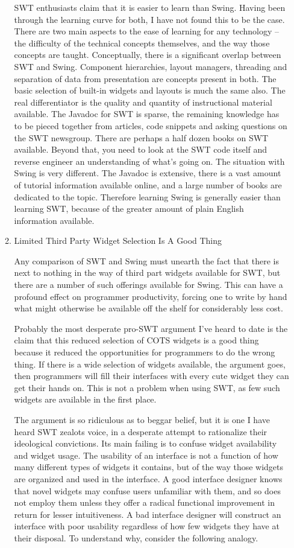 \documentclass{article}
\begin{document}
\begin{enumerate}
\begin{enumerate}
SWT enthusiasts claim that it is easier to learn than Swing. Having been
through the learning curve for both, I have not found this to be the
case. There are two main aspects to the ease of learning for any
technology -- the difficulty of the technical concepts themselves, and
the way those concepts are taught. Conceptually, there is a significant
overlap between SWT and Swing. Component hierarchies, layout managers,
threading and separation of data from presentation are concepts present
in both. The basic selection of built-in widgets and layouts is much the
same also. The real differentiator is the quality and quantity of
instructional material available. The Javadoc for SWT is sparse, the
remaining knowledge has to be pieced together from articles, code
snippets and asking questions on the SWT newsgroup. There are perhaps a
half dozen books on SWT available. Beyond that, you need to look at the
SWT code itself and reverse engineer an understanding of what's going
on. The situation with Swing is very different. The Javadoc is
extensive, there is a vast amount of tutorial information available
online, and a large number of books are dedicated to the topic.
Therefore learning Swing is generally easier than learning SWT, because
of the greater amount of plain English information available.

\item Limited Third Party Widget Selection Is A Good Thing
\label{sec:orgheadline296}

Any comparison of SWT and Swing must unearth the fact that there is next
to nothing in the way of third part widgets available for SWT, but there
are a number of such offerings available for Swing. This can have a
profound effect on programmer productivity, forcing one to write by hand
what might otherwise be available off the shelf for considerably less
cost.

Probably the most desperate pro-SWT argument I've heard to date is the
claim that this reduced selection of COTS widgets is a good thing
because it reduced the opportunities for programmers to do the wrong
thing. If there is a wide selection of widgets available, the argument
goes, then programmers will fill their interfaces with every cute widget
they can get their hands on. This is not a problem when using SWT, as
few such widgets are available in the first place.

The argument is so ridiculous as to beggar belief, but it is one I have
heard SWT zealots voice, in a desperate attempt to rationalize their
ideological convictions. Its main failing is to confuse widget
availability and widget usage. The usability of an interface is not a
function of how many different types of widgets it contains, but of the
way those widgets are organized and used in the interface. A good
interface designer knows that novel widgets may confuse users unfamiliar
with them, and so does not employ them unless they offer a radical
functional improvement in return for lesser intuitiveness. A bad
interface designer will construct an interface with poor usability
regardless of how few widgets they have at their disposal. To understand
why, consider the following analogy.


\end{enumerate}
\end{enumerate}
\end{document}
